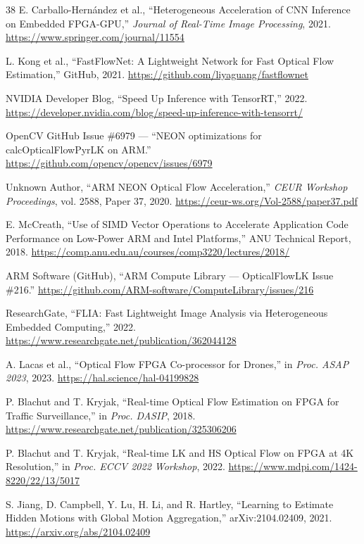 \documentclass[conference]{IEEEtran}
\begin{document}
\begin{thebibliography}{38}
E. Carballo-Hernández et al., ``Heterogeneous Acceleration of CNN Inference on Embedded FPGA-GPU,'' \textit{Journal of Real-Time Image Processing}, 2021. \url{https://www.springer.com/journal/11554}

L. Kong et al., ``FastFlowNet: A Lightweight Network for Fast Optical Flow Estimation,'' GitHub, 2021. \url{https://github.com/liyaguang/fastflownet}

NVIDIA Developer Blog, ``Speed Up Inference with TensorRT,'' 2022. \url{https://developer.nvidia.com/blog/speed-up-inference-with-tensorrt/}

OpenCV GitHub Issue \#6979 --- ``NEON optimizations for calcOpticalFlowPyrLK on ARM.'' \url{https://github.com/opencv/opencv/issues/6979}

Unknown Author, ``ARM NEON Optical Flow Acceleration,'' \textit{CEUR Workshop Proceedings}, vol. 2588, Paper 37, 2020. \url{https://ceur-ws.org/Vol-2588/paper37.pdf}

E. McCreath, ``Use of SIMD Vector Operations to Accelerate Application Code Performance on Low-Power ARM and Intel Platforms,'' ANU Technical Report, 2018. \url{https://comp.anu.edu.au/courses/comp3220/lectures/2018/}

ARM Software (GitHub), ``ARM Compute Library --- OpticalFlowLK Issue \#216.'' \url{https://github.com/ARM-software/ComputeLibrary/issues/216}

ResearchGate, ``FLIA: Fast Lightweight Image Analysis via Heterogeneous Embedded Computing,'' 2022. \url{https://www.researchgate.net/publication/362044128}

A. Lacas et al., ``Optical Flow FPGA Co-processor for Drones,'' in \textit{Proc. ASAP 2023}, 2023. \url{https://hal.science/hal-04199828}

P. Blachut and T. Kryjak, ``Real-time Optical Flow Estimation on FPGA for Traffic Surveillance,'' in \textit{Proc. DASIP}, 2018. \url{https://www.researchgate.net/publication/325306206}

P. Blachut and T. Kryjak, ``Real-time LK and HS Optical Flow on FPGA at 4K Resolution,'' in \textit{Proc. ECCV 2022 Workshop}, 2022. \url{https://www.mdpi.com/1424-8220/22/13/5017}

S. Jiang, D. Campbell, Y. Lu, H. Li, and R. Hartley, ``Learning to Estimate Hidden Motions with Global Motion Aggregation,'' arXiv:2104.02409, 2021. \url{https://arxiv.org/abs/2104.02409}


\end{thebibliography}
\end{document}
